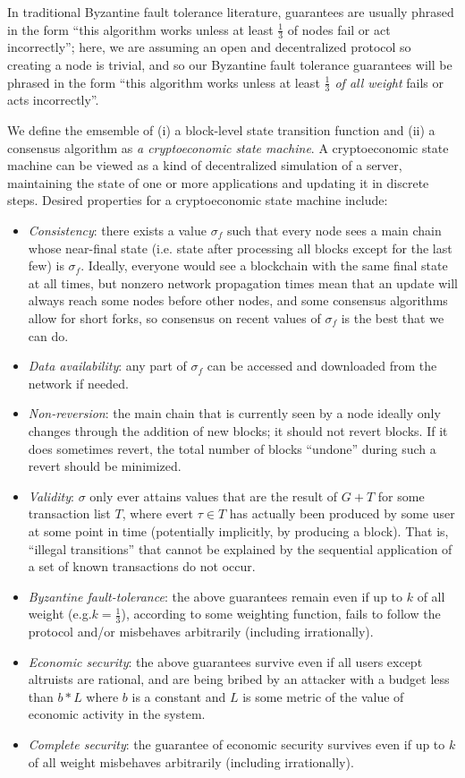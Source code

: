 \documentclass[11pt,a4paper]{article}
\makeatletter
\theoremstyle{plain}
\theoremstyle{definition}
\theoremstyle{remark}
\newcommand{\ie}{i.e.\@\xspace}
\newcommand{\eg}{e.g.\@\xspace}
\makeatother
\begin{document}
In traditional Byzantine fault tolerance literature, guarantees are usually phrased in the form ``this algorithm works unless at least $\frac{1}{3}$ of nodes fail or act incorrectly''; here, we are assuming an open and decentralized protocol so creating a node is trivial, and so our Byzantine fault tolerance guarantees will be phrased in the form ``this algorithm works unless at least \emph{$\frac{1}{3}$ of all weight} fails or acts incorrectly''.

We define the emsemble of (i) a block-level state transition function and (ii) a consensus algorithm as \emph{a cryptoeconomic state machine}. A cryptoeconomic state machine can be viewed as a kind of decentralized simulation of a server, maintaining the state of one or more applications and updating it in discrete steps. Desired properties for a cryptoeconomic state machine include:

\begin{itemize}
\item
\emph{Consistency}: there exists a value $\sigma_f$ such that every node sees a main chain whose near-final state (\ie state after processing all blocks except for the last few) is $\sigma_f$. Ideally, everyone would see a blockchain with the same final state at all times, but nonzero network propagation times mean that an update will always reach some nodes before other nodes, and some consensus algorithms allow for short forks, so consensus on recent values of $\sigma_f$ is the best that we can do.
\item
\emph{Data availability}: any part of $\sigma_f$ can be accessed and downloaded from the network if needed.
\item
\emph{Non-reversion}: the main chain that is currently seen by a node ideally only changes through the addition of new blocks; it should not revert blocks. If it does sometimes revert, the total number of blocks  ``undone'' during such a revert should be minimized.
\item
\emph{Validity}: $\sigma$ only ever attains values that are the result of $G + T$ for some transaction list $T$, where evert $\tau \in T$ has actually been produced by some user at some point in time (potentially implicitly, by producing a block). That is, ``illegal transitions'' that cannot be explained by the sequential application of a set of known transactions do not occur.
\item
\emph{Byzantine fault-tolerance}: the above guarantees remain even if up to $k$ of all weight (\eg $k = \frac{1}{3}$), according to some weighting function, fails to follow the protocol and/or misbehaves arbitrarily (including irrationally).
\item
\emph{Economic security}: the above guarantees survive even if all users except altruists are rational, and are being bribed by an attacker with a budget less than $b * L$ where $b$ is a constant and $L$ is some metric of the value of economic activity in the system.
\item
\emph{Complete security}: the guarantee of economic security survives even if up to $k$ of all weight misbehaves arbitrarily (including irrationally).
\end{itemize}
\end{document}
